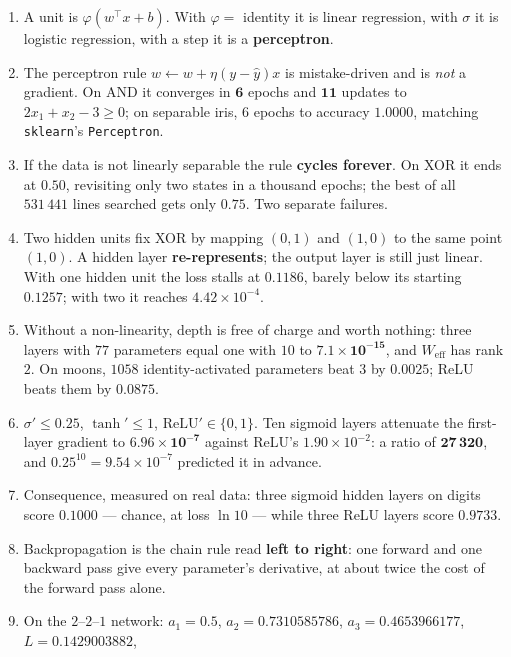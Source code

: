 \documentclass[11pt]{article}
\begin{document}
\begin{enumerate}[leftmargin=*]
  \item A unit is $\varphi(w^\top x + b)$. With $\varphi = $ identity it is
    linear regression, with $\sigma$ it is logistic regression, with a step it
    is a \textbf{perceptron}.
  \item The perceptron rule $w \leftarrow w + \eta(y-\hat y)x$ is
    mistake-driven and is \emph{not} a gradient. On AND it converges in
    $\mathbf{6}$ epochs and $\mathbf{11}$ updates to $2x_1 + x_2 - 3 \ge 0$;
    on separable iris, $6$ epochs to accuracy $1.0000$, matching
    \texttt{sklearn}'s \texttt{Perceptron}.
  \item If the data is not linearly separable the rule \textbf{cycles
    forever}. On XOR it ends at $0.50$, revisiting only two states in a
    thousand epochs; the best of all $531\,441$ lines searched gets only
    $\mathbf{0.75}$. Two separate failures.
  \item Two hidden units fix XOR by mapping $(0,1)$ and $(1,0)$ to the same
    point $(1,0)$. A hidden layer \textbf{re-represents}; the output layer is
    still just linear. With one hidden unit the loss stalls at $0.1186$,
    barely below its starting $0.1257$; with two it reaches
    $4.42\times10^{-4}$.
  \item Without a non-linearity, depth is free of charge and worth nothing:
    three layers with $77$ parameters equal one with $10$ to
    $\mathbf{7.1\times10^{-15}}$, and $W_{\text{eff}}$ has rank $2$. On moons,
    $1058$ identity-activated parameters beat $3$ by $0.0025$; ReLU beats them
    by $0.0875$.
  \item $\sigma' \le \mathbf{0.25}$, $\tanh' \le 1$,
    $\mathrm{ReLU}' \in \{0,1\}$. Ten sigmoid layers attenuate the first-layer
    gradient to $\mathbf{6.96\times10^{-7}}$ against ReLU's
    $1.90\times10^{-2}$: a ratio of $\mathbf{27\,320}$, and
    $0.25^{10} = 9.54\times10^{-7}$ predicted it in advance.
  \item Consequence, measured on real data: three sigmoid hidden layers on
    digits score $\mathbf{0.1000}$ --- chance, at loss $\ln 10$ --- while
    three ReLU layers score $0.9733$.
  \item Backpropagation is the chain rule read \textbf{left to right}: one
    forward and one backward pass give every parameter's derivative, at about
    twice the cost of the forward pass alone.
  \item On the $2$--$2$--$1$ network: $a_1 = 0.5$, $a_2 = 0.7310585786$,
    $a_3 = 0.4653966177$, $L = \mathbf{0.1429003882}$,

\end{enumerate}
\end{document}
